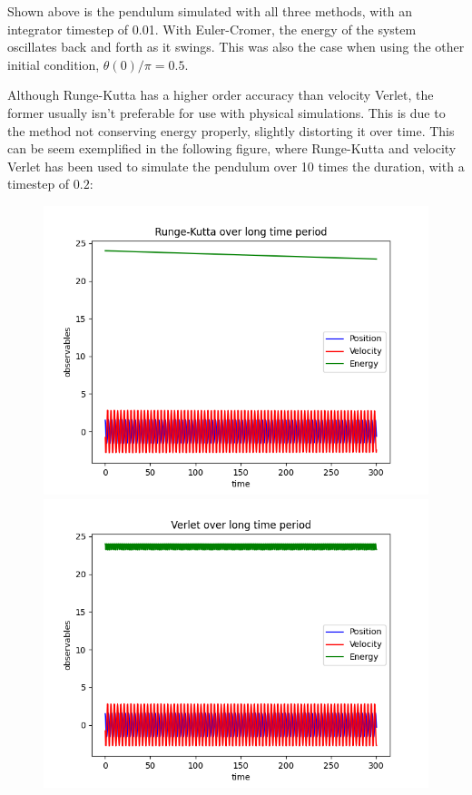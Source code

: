 \documentclass[a4paper,12pt]{article}
\begin{document}
\begin{figure}[!ht]
\end{figure}

Shown above is the pendulum simulated with all three methods, with an integrator timestep of 0.01.
With Euler-Cromer, the energy of the system oscillates back and forth as it swings. This was also the case
when using the other initial condition, $\theta(0)/\pi = 0.5$.

Although Runge-Kutta has a higher order accuracy than velocity Verlet, the former usually isn't preferable
for use with physical simulations. This is due to the method not conserving energy properly, slightly
distorting it over time. This can be seem exemplified in the following figure, where Runge-Kutta and velocity
Verlet has been used to simulate the pendulum over 10 times the duration, with a timestep of $0.2$:

\begin{figure}[!ht]
  \centering
  \begin{minipage}{0.45\textwidth}
    \includegraphics[width=\textwidth]{img/1-runge-kutta-long.png}
  \end{minipage}
  \begin{minipage}{0.45\textwidth}
    \includegraphics[width=\textwidth]{img/1-verlet-long.png}
  \end{minipage}
\end{figure}
\end{document}
